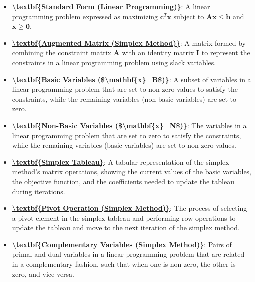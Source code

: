 \documentclass{article}%
\begin{document}
\begin{itemize}[leftmargin=*]%
\item \href{https://www.math.purdue.edu/~yipn/421/2024-09-24-SimplexMatrix.pdf#page=1}{\textbf{\textbackslash{}textbf\{Standard Form (Linear Programming)\}}}: A linear programming problem expressed as maximizing $\mathbf{c}^T \mathbf{x}$ subject to $\mathbf{A} \mathbf{x} \le \mathbf{b}$ and $\mathbf{x} \ge \mathbf{0}$.%
\item \href{https://www.math.purdue.edu/~yipn/421/2024-09-24-SimplexMatrix.pdf#page=3}{\textbf{\textbackslash{}textbf\{Augmented Matrix (Simplex Method)\}}}: A matrix formed by combining the constraint matrix $\mathbf{A}$ with an identity matrix $\mathbf{I}$ to represent the constraints in a linear programming problem using slack variables.%
\item \href{https://www.math.purdue.edu/~yipn/421/2024-09-24-SimplexMatrix.pdf#page=4}{\textbf{\textbackslash{}textbf\{Basic Variables (\$\textbackslash{}mathbf\{x\}\_B\$)\}}}: A subset of variables in a linear programming problem that are set to non-zero values to satisfy the constraints, while the remaining variables (non-basic variables) are set to zero.%
\item \href{https://www.math.purdue.edu/~yipn/421/2024-09-24-SimplexMatrix.pdf#page=4}{\textbf{\textbackslash{}textbf\{Non{-}Basic Variables (\$\textbackslash{}mathbf\{x\}\_N\$)\}}}: The variables in a linear programming problem that are set to zero to satisfy the constraints, while the remaining variables (basic variables) are set to non-zero values.%
\item \href{https://www.math.purdue.edu/~yipn/421/2024-09-24-SimplexMatrix.pdf#page=10}{\textbf{\textbackslash{}textbf\{Simplex Tableau\}}}: A tabular representation of the simplex method's matrix operations, showing the current values of the basic variables, the objective function, and the coefficients needed to update the tableau during iterations.%
\item \href{https://www.math.purdue.edu/~yipn/421/2024-09-24-SimplexMatrix.pdf#page=17}{\textbf{\textbackslash{}textbf\{Pivot Operation (Simplex Method)\}}}: The process of selecting a pivot element in the simplex tableau and performing row operations to update the tableau and move to the next iteration of the simplex method.%
\item \href{https://www.math.purdue.edu/~yipn/421/2024-09-24-SimplexMatrix.pdf#page=14}{\textbf{\textbackslash{}textbf\{Complementary Variables (Simplex Method)\}}}: Pairs of primal and dual variables in a linear programming problem that are related in a complementary fashion, such that when one is non-zero, the other is zero, and vice-versa.%

\end{itemize}
\end{document}
